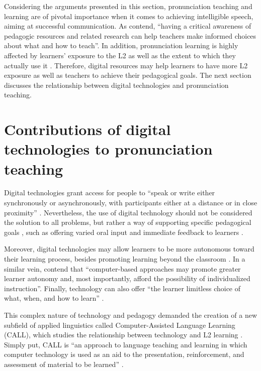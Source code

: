 \documentclass[english]{textolivre}
\begin{document}
Considering the arguments presented in this section, pronunciation
teaching and learning are of pivotal importance when it comes to
achieving intelligible speech, aiming at successful communication. As
\textcite[p.~219]{pennington2019} contend, ``having a
critical awareness of pedagogic resources and related research can help
teachers make informed choices about what and how to teach''. In
addition, pronunciation learning is highly affected by learners'
exposure to the L2 as well as the extent to which they actually use it
\cite{lane2010}. Therefore, digital resources may help learners to have
more L2 exposure as well as teachers to achieve their pedagogical goals.
The next section discusses the relationship between digital technologies
and pronunciation teaching.


\section{Contributions of digital technologies to pronunciation
teaching}\label{sec-contributions}

Digital technologies grant access for people to ``speak or write either
synchronously or asynchronously, with participants either at a distance
or in close proximity'' \cite[p.~66]{chun2016}. Nevertheless, the use
of digital technology should not be considered the solution to all
problems, but rather a way of supporting specific pedagogical goals
\cite{chun2016}, such as offering varied oral input and immediate
feedback to learners \cite{baldissera2021}.


Moreover, digital technologies may allow learners to be more autonomous
toward their learning process, besides promoting learning beyond the
classroom \cite{lai2018}. In a similar vein, \textcite[p.~336]{thomson2015} contend that ``computer-based approaches may promote greater
learner autonomy and, most importantly, afford the possibility of
individualized instruction''. Finally, technology can also offer ``the
learner limitless choice of what, when, and how to learn''
\cite[p.~201]{rogersonrevell2021}.

This complex nature of technology and pedagogy demanded the creation of
a new subfield of applied linguistics called Computer-Assisted Language
Learning (CALL), which studies the relationship between technology and
L2 learning \cite{martins2012}. Simply put, CALL is ``an approach to
language teaching and learning in which computer technology is used as
an aid to the presentation, reinforcement, and assessment of material to
be learned'' \cite[p.~261]{davies2006}.
\end{document}
